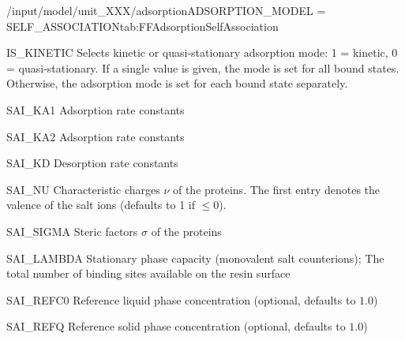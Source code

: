 \begin{condsubgroup}{/input/model/unit\_XXX/adsorption}{ADSORPTION\_MODEL = SELF\_ASSOCIATION}{tab:FFAdsorptionSelfAssociation}
\begin{dataset}[type=int,range={$\{ 0,1 \}$},length={1 / \texttt{NTOTALBND}}]{IS\_KINETIC}
    Selects kinetic or quasi-stationary adsorption mode: 1 = kinetic, 0 = quasi-stationary.
    If a single value is given, the mode is set for all bound states.
    Otherwise, the adsorption mode is set for each bound state separately.
  \end{dataset}
  \begin{dataset}[unit=\si{\raiseto{3}\metre\of{MP}\per\raiseto{3}\metre\of{SP}\per\second}, type=double,range={$\geq 0$},length={\texttt{NCOMP}}]{SAI\_KA1}
    Adsorption rate constants
  \end{dataset}
  \begin{dataset}[unit=\si{\raiseto{6}\metre\of{MP}\per\raiseto{6}\metre\of{SP}\per\second}, type=double,range={$\geq 0$},length={\texttt{NCOMP}}]{SAI\_KA2}
    Adsorption rate constants
  \end{dataset}
  \begin{dataset}[unit=\si{\per\second}, type=double,range={$\geq 0$},length={\texttt{NCOMP}}]{SAI\_KD}
    Desorption rate constants
  \end{dataset}
  \begin{dataset}[type=double,range={$\geq 0$},length={\texttt{NCOMP}}]{SAI\_NU}
    Characteristic charges $\nu$ of the proteins.
    The first entry denotes the valence of the salt ions (defaults to 1 if $\leq 0$).
  \end{dataset}
  \begin{dataset}[type=double,range={$\geq 0$},length={\texttt{NCOMP}}]{SAI\_SIGMA}
    Steric factors $\sigma$ of the proteins
  \end{dataset}
  \begin{dataset}[unit=\si{\mol\per\cubic\metre\of{SP}}, type=double,range={$\geq 0$},length={1}]{SAI\_LAMBDA}
    Stationary phase capacity (monovalent salt counterions); The total number of binding sites available on the resin surface
  \end{dataset}
  \begin{dataset}[unit=\si{\mol\per\raiseto{3}\metre\of{MP}}, type=double,range={$> 0$},length={1}]{SAI\_REFC0}
    Reference liquid phase concentration (optional, defaults to $1.0$)
  \end{dataset}
  \begin{dataset}[unit=\si{\mol\per\raiseto{3}\metre\of{SP}}, type=double,range={$> 0$},length={1}]{SAI\_REFQ}
    Reference solid phase concentration (optional, defaults to $1.0$) 
  \end{dataset}
\end{condsubgroup}

